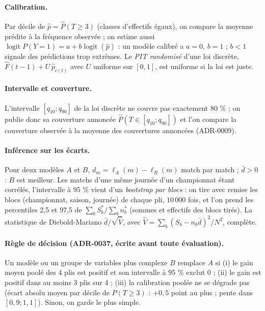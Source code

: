\paragraph{Calibration.} Par décile de \(\hat p = \hat P(T \ge 3)\) (classes d'effectifs égaux), on
compare la moyenne prédite à la fréquence observée ; on estime aussi \(\operatorname{logit} P(Y = 1)
= a + b \operatorname{logit}(\hat p)\) : un modèle calibré a \(a = 0\), \(b = 1\) ; \(b < 1\) signale des
prédictions trop extrêmes. Le \emph{PIT randomisé} d'une loi discrète, \(\hat F(t - 1) + U\, \hat
p_{c(t)}\) avec \(U\) uniforme sur \([0, 1]\), est uniforme si la loi est juste.

\paragraph{Intervalle et couverture.} L'intervalle \([q_{10} ; q_{90}]\) de la loi discrète ne couvre pas
exactement 80 \% ; on publie donc sa couverture annoncée \(\hat P(T \in [q_{10} ; q_{90}])\) et l'on
compare la couverture observée à la moyenne des couvertures annoncées (ADR-0009).

\paragraph{Inférence sur les écarts.} Pour deux modèles \(A\) et \(B\), \(d_m = \ell_A(m) - \ell_B(m)\)
match par match ; \(\bar d > 0\) : \(B\) est meilleur. Les matchs d'une même journée d'un championnat
étant corrélés, l'intervalle à 95 \% vient d'un \emph{bootstrap par blocs} : on tire avec remise les
blocs (championnat, saison, journée) de chaque pli, \(10\,000\) fois, et l'on prend les percentiles
2,5 et 97,5 de \(\sum_b S_b^* / \sum_b n_b^*\) (sommes et effectifs des blocs tirés). La statistique
de Diebold-Mariano \(\bar d / \sqrt{\hat V}\), avec \(\hat V = \sum_b (S_b - n_b \bar d)^2 / N^2\), complète.

\paragraph{Règle de décision (ADR-0037, écrite avant toute évaluation).} Un modèle ou un groupe de
variables plus complexe \(B\) remplace \(A\) si (i) le gain moyen poolé des 4 plis est positif et son
intervalle à 95 \% exclut 0 ; (ii) le gain est positif dans au moins 3 plis sur 4 ; (iii) la
calibration poolée ne se dégrade pas (écart absolu moyen par décile de \(P(T \ge 3)\) : \(+0{,}5\)
point au plus ; pente dans \([0{,}9 ; 1{,}1]\)). Sinon, on garde le plus simple.

